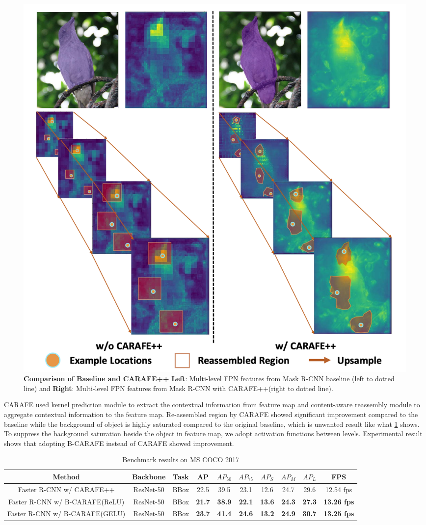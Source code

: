 \documentclass[10pt,twocolumn,letterpaper]{article}
\begin{document}
\begin{figure}
  \centering
   \includegraphics[width=0.8\linewidth]{./img/image.png}
   \caption{\textbf{Comparison of Baseline and CARAFE++\cite{CARAFE}} \textbf{Left}: Multi-level FPN\cite{FPN} features from Mask R-CNN baseline (left to dotted line) and \textbf{Right}: Multi-level FPN features from Mask R-CNN with CARAFE++(right to dotted line).}
   \label{fig:compare_carafe}
\end{figure}

CARAFE used kernel prediction module to extract the contextual information from feature map and content-aware reassembly module to aggregate contextual information to the feature map.
Re-assembled region by CARAFE showed significant improvement compared to the baseline while the background of object is highly saturated compared to the original baseline, which is unwanted result like what \cref{fig:compare_carafe} shows.
To suppress the background saturation beside the object in feature map, we adopt activation functions between levels.
Experimental result shows that adopting B-CARAFE instead of CARAFE showed improvement.

\begin{table}
  \centering
  \begin{tabular}{@{}cccccccccc@{}}
    \hline
    Method & Backbone & Task & AP & $AP_{50}$ & $AP_{75}$ & $AP_S$ & $AP_M$ & $AP_L$ & FPS \\
    \hline
    Faster R-CNN w/ CARAFE++ & ResNet-50 & BBox & 22.5 & 39.5 & 23.1 & 12.6 & 24.7 & 29.6 & 12.54 fps \\
    Faster R-CNN w/ B-CARAFE(ReLU) & ResNet-50 & BBox & \textbf{21.7} & \textbf{38.9} & \textbf{22.1} & \textbf{13.6} & \textbf{24.3} & \textbf{27.3} & \textbf{13.26 fps} \\
    Faster R-CNN w/ B-CARAFE(GELU) & ResNet-50 & BBox & \textbf{23.7} & \textbf{41.4} & \textbf{24.6} & \textbf{13.2} & \textbf{24.9} & \textbf{30.7} & \textbf{13.25 fps} \\
    \hline
  \end{tabular}
  \caption{Benchmark results on MS COCO 2017}
  \label{tab:result}
\end{table}
\end{document}
